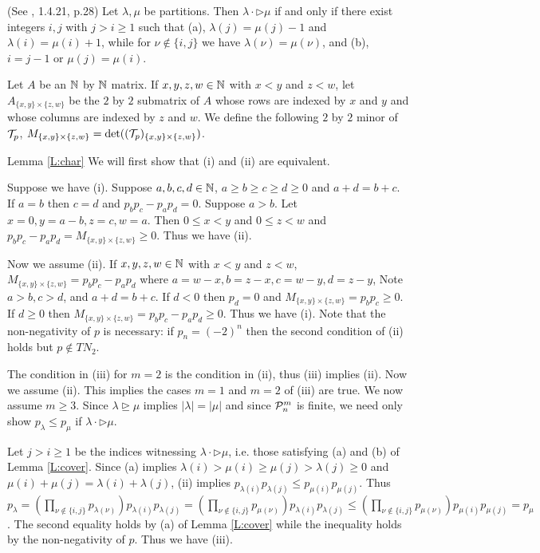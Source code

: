 \documentclass[12pt]{article}
\begin{document}
\begin{lemma}(See \cite{James:1981aa}, 1.4.21, p.28) \label{L:cover}
Let $\lambda, \mu$ be partitions.  Then $\lambda \cdot \triangleright \mu$ if and only if there exist integers $i,j$ with $j > i \geq 1$ such that (a), $\lambda(j) = \mu(j)-1$ and $\lambda(i) = \mu(i)+1$, while for $\nu \not \in \{i,j\}$ we have $\lambda(\nu)=\mu(\nu)$, and (b), $i = j-1$ or $\mu(j) = \mu(i)$.
\end{lemma}

Let $A$ be an $\mathbb{N}$ by $\mathbb{N}$ matrix.  If $x,y,z,w \in \mathbb{N}$ with $x <y$ and $z < w$, let $A_{\{x,y\} \times \{z,w\}}$ be the $2$ by $2$ submatrix of $A$ whose rows are indexed by $x$ and $y$ and whose columns are indexed by $z$ and $w$. We define the following $2$ by $2$ minor of ${\cal T}_p$, $M_{\{x,y\} \times \{z,w\}} = \det(({\cal T}_p)_{\{x,y\} \times \{z,w\}})$.

\begin{proofof}{Lemma \ref{L:char}}  We will first show that (i) and (ii) are equivalent.

Suppose we have (i).  Suppose $a,b,c,d \in \mathbb{N}$, $a \geq b \geq c \geq d \geq0$ and $a+d = b+c$.  If $a=b$ then $c=d$ and $p_b p_c - p_a p_d =0$.  Suppose $a > b$.  Let $x =0, y=a-b, z = c, w = a$.  Then $0 \leq x < y$ and $0 \leq z < w$ and $p_b p_c - p_a p_d = M_{\{x,y\} \times \{z,w\}} \geq 0$.  Thus we have (ii).


Now we assume (ii). If $x,y,z,w \in \mathbb{N}$ with $x <y$ and $z < w$, $M_{\{x,y\} \times \{z,w\}} = p_b p_c - p_a p_d$ where $a = w-x , b = z-x, c = w - y , d = z-y$, Note $a > b,c > d$, and $a+d = b+c$.  If $d <0$ then $p_d = 0$ and $M_{\{x,y\} \times \{z,w\}} = p_b p_c \geq 0$.  If $d \geq 0$ then $M_{\{x,y\} \times \{z,w\}} = p_b p_c - p_a p_d \geq 0$.  Thus we have (i).  Note that the non-negativity of $p$ is necessary: if $p_n = (-2)^n$ then the second condition of (ii) holds but $p \not \in TN_2$.



The condition in (iii) for $m=2$ is the condition in (ii), thus (iii) implies (ii). Now we assume (ii).  This implies the cases $m=1$ and $m=2$ of (iii) are true.  We now assume $m\geq 3$.  Since $\lambda \trianglerighteq \mu$ implies $|\lambda| = |\mu|$ and since ${\cal P}^m_n$ is finite, we need only show $p_\lambda \leq p_\mu$ if $\lambda \cdot \triangleright \mu$.

Let $j > i \geq 1$ be the indices witnessing $\lambda \cdot \triangleright \mu$, i.e. those satisfying (a) and (b) of Lemma \ref{L:cover}.  Since (a) implies $\lambda(i) > \mu(i) \geq \mu(j) > \lambda(j) \geq 0$ and $\mu(i) + \mu(j) = \lambda(i) + \lambda(j)$, (ii) implies $p_{\lambda(i)}p_{\lambda(j)} \leq p_{\mu(i)}p_{\mu(j)}$. Thus $p_{\lambda} = (\prod_{\nu \not \in \{i,j\}} p_{\lambda(\nu)}) p_{\lambda(i)}p_{\lambda(j)} = (\prod_{\nu \not \in \{i,j\}} p_{\mu(\nu)}) p_{\lambda(i)}p_{\lambda(j)} \leq (\prod_{\nu \not \in \{i,j\}} p_{\mu(\nu)}) p_{\mu(i)}p_{\mu(j)} = p_{\mu}$.  The second equality holds by (a) of Lemma \ref{L:cover} while the inequality holds by the non-negativity of $p$.  Thus we have (iii).
\end{proofof}
\end{document}
